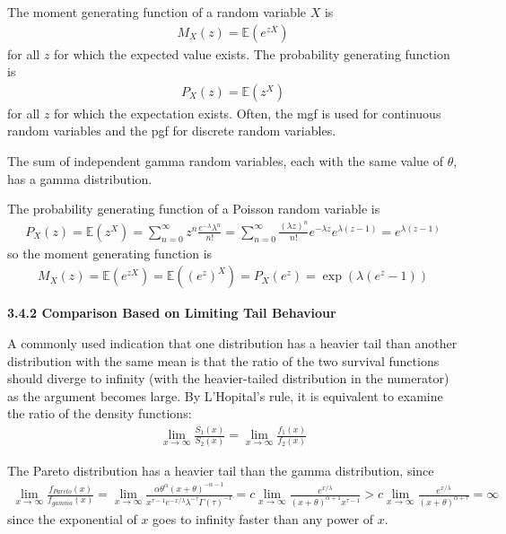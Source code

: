 \documentclass[hidelinks, 12pt]{article}
\theoremstyle{mydefstyle}
\theoremstyle{mythmstyle}
\begin{document}
The moment generating function of a random variable $X$ is 
\begin{gather*}
M_X(z) = \mathbb{E}(e^{zX})
\end{gather*}
for all $z$ for which the expected value exists. The probability generating function is
\begin{gather*}
P_X(z) = \mathbb{E}(z^X)
\end{gather*}
for all $z$ for which the expectation exists. Often, the mgf is used for continuous random variables and the pgf for discrete random variables. 

The sum of independent gamma random variables, each with the same value of $\theta$, has a gamma distribution. 

The probability generating function of a Poisson random variable is
\begin{gather*}
P_X(z) = \mathbb{E}(z^X)
= \sum_{n = 0}^{\infty} z^n \frac{e^{-\lambda} \lambda^n}{n!}
= \sum_{n = 0}^{\infty} \frac{(\lambda z)^n}{n!} e^{-\lambda z} e^{\lambda(z-1)}
= e^{\lambda(z-1)}
\end{gather*}
so the moment generating function is
\begin{gather*}
M_X(z) = \mathbb{E}(e^{zX}) = \mathbb{E}((e^z)^X) = P_X(e^z) = \exp\left(\lambda(e^z - 1)\right)
\end{gather*}

\textbf{3.4.2 Comparison Based on Limiting Tail Behaviour}

A commonly used indication that one distribution has a heavier tail than another distribution with the same mean is that the ratio of the two survival functions should diverge to infinity (with the heavier-tailed distribution in the numerator) as the argument becomes large. By L'Hopital's rule, it is equivalent to examine the ratio of the density functions:
\begin{gather*}
\lim_{x \to \infty} \frac{S_1(x)}{S_2(x)} = \lim_{x \to \infty} \frac{f_1(x)}{f_2(x)}
\end{gather*}

The Pareto distribution has a heavier tail than the gamma distribution, since
\begin{gather*}
\lim_{x \to \infty} \frac{f_{Pareto}(x)}{f_{gamma}(x)}
= \lim_{x \to \infty} \frac{\alpha \theta^{\alpha} (x+\theta)^{-\alpha-1}}{x^{\tau-1} e^{-x/\lambda} \lambda^{-\tau} \Gamma(\tau)^{-1}}
= c \lim_{x \to \infty} \frac{e^{x/\lambda}}{(x+\theta)^{\alpha + 1} x^{\tau - 1}}
> c \lim_{x \to \infty} \frac{e^{x/\lambda}}{(x+\theta)^{\alpha + \tau}} = \infty
\end{gather*}
since the exponential of $x$ goes to infinity faster than any power of $x$.
\end{document}

